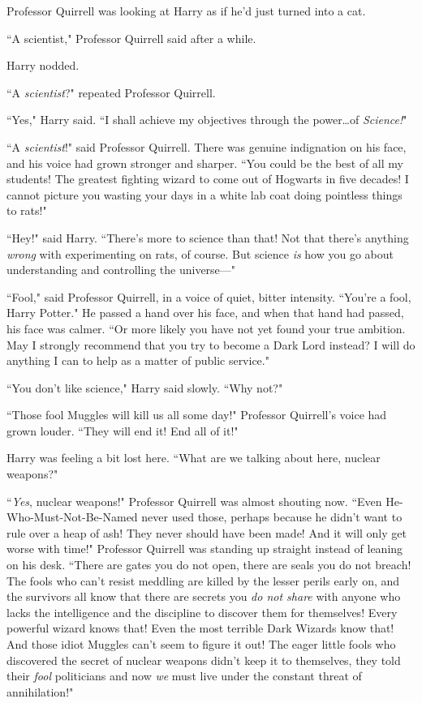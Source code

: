 Professor Quirrell was looking at Harry as if he'd just turned into a cat.

``A scientist," Professor Quirrell said after a while.

Harry nodded.

``A \emph{scientist}?" repeated Professor Quirrell.

``Yes," Harry said. ``I shall achieve my objectives through the power…of \emph{Science!}"

``A \emph{scientist}!" said Professor Quirrell. There was genuine indignation on his face, and his voice had grown stronger and sharper. ``You could be the best of all my students! The greatest fighting wizard to come out of Hogwarts in five decades! I cannot picture you wasting your days in a white lab coat doing pointless things to rats!"

``Hey!" said Harry. ``There's more to science than that! Not that there's anything \emph{wrong} with experimenting on rats, of course. But science \emph{is} how you go about understanding and controlling the universe—"

``Fool," said Professor Quirrell, in a voice of quiet, bitter intensity. ``You're a fool, Harry Potter." He passed a hand over his face, and when that hand had passed, his face was calmer. ``Or more likely you have not yet found your true ambition. May I strongly recommend that you try to become a Dark Lord instead? I will do anything I can to help as a matter of public service."

``You don't like science," Harry said slowly. ``Why not?"

``Those fool Muggles will kill us all some day!" Professor Quirrell's voice had grown louder. ``They will end it! End all of it!"

Harry was feeling a bit lost here. ``What are we talking about here, nuclear weapons?"

``\emph{Yes}, nuclear weapons!" Professor Quirrell was almost shouting now. ``Even He-Who-Must-Not-Be-Named never used those, perhaps because he didn't want to rule over a heap of ash! They never should have been made! And it will only get worse with time!" Professor Quirrell was standing up straight instead of leaning on his desk. ``There are gates you do not open, there are seals you do not breach! The fools who can't resist meddling are killed by the lesser perils early on, and the survivors all know that there are secrets you \emph{do not share} with anyone who lacks the intelligence and the discipline to discover them for themselves! Every powerful wizard knows that! Even the most terrible Dark Wizards know that! And those idiot Muggles can't seem to figure it out! The eager little fools who discovered the secret of nuclear weapons didn't keep it to themselves, they told their \emph{fool} politicians and now \emph{we} must live under the constant threat of annihilation!"

